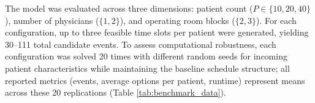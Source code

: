 \begin{table}[ht]
    \centering
    \caption{Benchmark Data Results (mean values over 20 independent runs per configuration)}
    \label{tab:benchmark_data}
\end{table}

The model was evaluated across three dimensions: patient count ($P \in \{10, 20, 40\}$), number of physicians ($\{1, 2\}$), and operating room blocks ($\{2, 3\}$). For each configuration, up to three feasible time slots per patient were generated, yielding 30--111 total candidate events. To assess computational robustness, each configuration was solved 20 times with different random seeds for incoming patient characteristics while maintaining the baseline schedule structure; all reported metrics (events, average options per patient, runtime) represent means across these 20 replications (Table \ref{tab:benchmark_data}).

